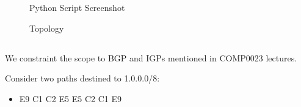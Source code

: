 \documentclass[12pt]{article}
\newcommand\twoitems[2]{%
\item#1%
\hspace{20pt}%
\labelitemi
\hspace{\labelsep}#2
}
\begin{document}
\newpage
\section{}

\renewcommand{\thesubsection}{\thesection.\alph{subsection}}

\subsection{}

\begin{figure}[h!]
  \caption{Python Script Screenshot}
  \label{fig:python-screenshot}
\end{figure}

\begin{figure}[h!]
  \caption{Topology}
  \label{fig:topology}
\end{figure}

\newpage
\subsection{}

We constraint the scope to BGP and IGPs mentioned in COMP0023 lectures.

Consider two paths destined to 1.0.0.0/8:
\begin{itemize}
    \twoitems{E9 \textrightarrow{} C1 \textrightarrow{} C2 \textrightarrow{} E5}{E5 \textrightarrow{} C2 \textrightarrow{} C1 \textrightarrow{} E9}
\end{itemize}
\end{document}
